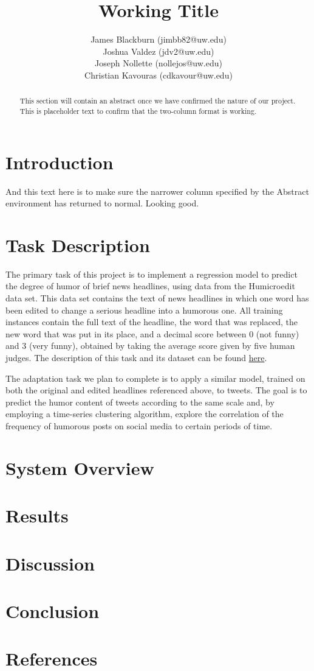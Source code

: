 \documentclass{article}
\title{Working Title}
\author{
James Blackburn (jimbb82@uw.edu)\\
Joshua Valdez (jdv2@uw.edu)\\
Joseph Nollette (nollejos@uw.edu)\\
Christian Kavouras (cdkavour@uw.edu)
}
\date{\vspace{-5ex}}
\begin{document}
\maketitle

\begin{abstract}
This section will contain an abstract once we have confirmed the nature of our project. This is placeholder text to confirm that the two-column format is working.
\end{abstract}

\section{Introduction}
And this text here is to make sure the narrower column specified by the Abstract environment has returned to normal. Looking good.

\section{Task Description}
The primary task of this project is to implement a regression model to predict the degree of humor of brief news headlines, using data from the Humicroedit data set. This data set contains the text of news headlines in which one word has been edited to change a serious headline into a humorous one. All training instances contain the full text of the headline, the word that was replaced, the new word that was put in its place, and a decimal score between 0 (not funny) and 3 (very funny), obtained by taking the average score given by five human judges. The description of this task and its dataset can be found \href{https://competitions.codalab.org/competitions/20970}{here}.\cite{hossain-etal-2019-president}

The adaptation task we plan to complete is to apply a similar model, trained on both the original and edited headlines referenced above, to tweets. The goal is to predict the humor content of tweets according to the same scale and, by employing a time-series clustering algorithm, explore the correlation of the frequency of humorous posts on social media to certain periods of time.

\section{System Overview}

\section{Results}

\section{Discussion}

\section{Conclusion}

\section{References}



\end{document}
